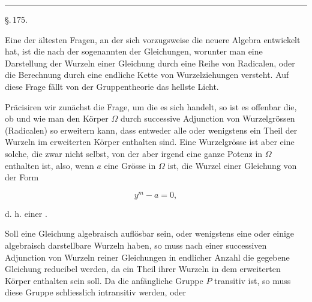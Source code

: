 
\begin{center}


\rule{3cm}{0.4pt}

\S.\,175.

\end{center}

Eine der ältesten Fragen, an der sich vorzugsweise die
neuere Algebra entwickelt hat, ist die nach der sogenannten
 der Gleichungen, worunter man eine
Darstellung der Wurzeln einer Gleichung durch eine Reihe von
Radicalen, oder die Berechnung durch eine endliche Kette von
Wurzelziehungen versteht. Auf diese Frage fällt von der Gruppentheorie das hellste Licht.

Präcisiren wir zunächst die Frage, um die es sich handelt,
so ist es offenbar die, ob und wie man den Körper $\Omega$ durch
successive Adjunction von Wurzelgrössen (Radicalen) so erweitern
kann, dass entweder alle oder wenigstens ein Theil der Wurzeln
im erweiterten Körper enthalten sind. Eine Wurzelgrösse ist
aber eine solche, die zwar nicht selbst, von der aber irgend eine
ganze Potenz in $\Omega$ enthalten ist, also, wenn $a$ eine Grösse in $\Omega$
ist, die Wurzel einer Gleichung von der Form

\[
y^m - a = 0,
\]

d. h. einer .

Soll eine  Gleichung algebraisch auflösbar sein,
oder wenigstens eine oder einige algebraisch darstellbare Wurzeln
haben, so muss nach einer successiven Adjunction von Wurzeln
reiner Gleichungen in endlicher Anzahl die gegebene Gleichung
reducibel werden, da ein Theil ihrer Wurzeln in dem erweiterten
Körper enthalten sein soll. Da die anfängliche Gruppe $P$ transitiv
ist, so muss diese Gruppe schliesslich intransitiv werden, oder
